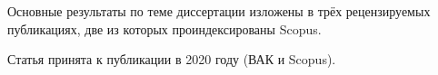 {%

    \begin{refsection}









        \nocite{intracoh, popov_hier, bulatov2020topicnet, thetaless}

          \nocite{prog_cook}%

          \nocite{prog_stkc}%

          \nocite{prog_view}%

    \end{refsection}%

      \nocite{fntir2017applications}%







}

{\publications} Основные результаты по теме диссертации изложены в трёх рецензируемых публикациях, две из которых проиндексированы Scopus.

Статья \cite{thetaless} принята к публикации в 2020 году (ВАК и Scopus).





